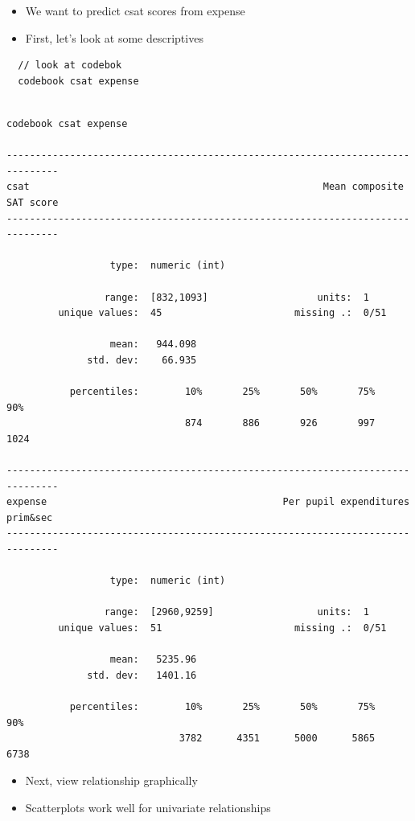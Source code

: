 \documentclass[]{book}
\providecommand{\tightlist}{%
  \setlength{\itemsep}{0pt}\setlength{\parskip}{0pt}}
\begin{document}
\begin{itemize}
\tightlist
\item
  We want to predict csat scores from expense
\item
  First, let's look at some descriptives
\end{itemize}

\begin{verbatim}
  // look at codebok
  codebook csat expense
\end{verbatim}

\begin{verbatim}

codebook csat expense

-------------------------------------------------------------------------------
csat                                                   Mean composite SAT score
-------------------------------------------------------------------------------

                  type:  numeric (int)

                 range:  [832,1093]                   units:  1
         unique values:  45                       missing .:  0/51

                  mean:   944.098
              std. dev:    66.935

           percentiles:        10%       25%       50%       75%       90%
                               874       886       926       997      1024

-------------------------------------------------------------------------------
expense                                         Per pupil expenditures prim&sec
-------------------------------------------------------------------------------

                  type:  numeric (int)

                 range:  [2960,9259]                  units:  1
         unique values:  51                       missing .:  0/51

                  mean:   5235.96
              std. dev:   1401.16

           percentiles:        10%       25%       50%       75%       90%
                              3782      4351      5000      5865      6738
\end{verbatim}

\begin{itemize}
\tightlist
\item
  Next, view relationship graphically
\item
  Scatterplots work well for univariate relationships
\end{itemize}
\end{document}

